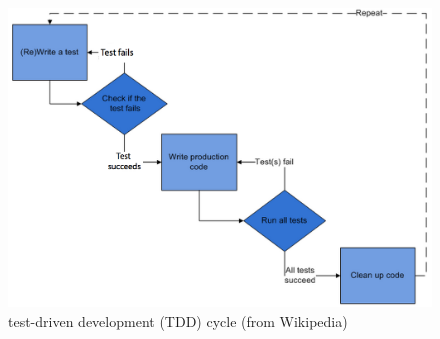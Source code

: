 \documentclass[11pt,oneside]{article}	%
\begin{document}
\begin{figure}[htbp] %
   \centering
   \includegraphics[width=0.8\linewidth]{images/tdd.png} 
   \caption{test-driven development (TDD) cycle (from Wikipedia)}
   \label{fig:tdd}
\end{figure}



\end{document}
